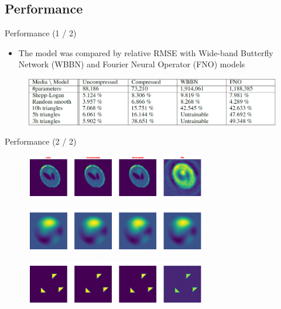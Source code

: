 \documentclass{beamer}
\begin{document}
\subsection{Performance}
\begin{frame}{Performance (1 / 2)}
    \begin{itemize}
        \item The model was compared by relative RMSE with Wide-band Butterfly Network (WBBN) and Fourier Neural Operator (FNO) models
    \end{itemize}
    \begin{figure}
        \centering
        \includegraphics[width=\textwidth]{images/Comparison.png}
    \end{figure}
\end{frame}

\begin{frame}{Performance (2 / 2)}
    \begin{figure}
        \centering
        \includegraphics[width=0.7\textwidth]{images/comp1.png}
    \end{figure}
    \begin{figure}
        \centering
        \includegraphics[width=0.7\textwidth]{images/comp3.png}
    \end{figure}
    \begin{figure}
        \centering
        \includegraphics[width=0.7\textwidth]{images/comp2.png}
    \end{figure}
\end{frame}
\end{document}
